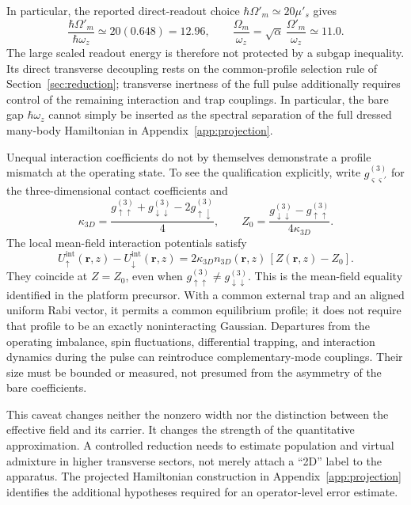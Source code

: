 \documentclass[11pt,a4paper]{article}
\theoremstyle{definition}
\theoremstyle{remark}
\newcommand{\musp}{\mu'_s}
\begin{document}
In particular, the reported direct-readout choice $\hbar\Omega'_m\simeq20\musp$ gives
\begin{equation}
 \frac{\hbar\Omega'_m}{\hbar\omega_z}
 \simeq20(0.648)=12.96,\qquad
 \frac{\Omega_m}{\omega_z}
 =\sqrt\alpha\,\frac{\Omega'_m}{\omega_z}\simeq11.0.
 \tag{21a}\label{eq:readout_gap}
\end{equation}
The large scaled readout energy is therefore not protected by a subgap inequality. Its direct transverse decoupling rests on the common-profile selection rule of Section~\ref{sec:reduction}; transverse inertness of the full pulse additionally requires control of the remaining interaction and trap couplings. In particular, the bare gap $\hbar\omega_z$ cannot simply be inserted as the spectral separation of the full dressed many-body Hamiltonian in Appendix~\ref{app:projection}.\cite{zhang2026}

Unequal interaction coefficients do not by themselves demonstrate a profile mismatch at the operating state. To see the qualification explicitly, write $g^{(3)}_{\varsigma\varsigma'}$ for the three-dimensional contact coefficients and
\[
 \kappa_{3D}=\frac{g^{(3)}_{\uparrow\uparrow}
 +g^{(3)}_{\downarrow\downarrow}-2g^{(3)}_{\uparrow\downarrow}}4,
 \qquad
 Z_0=\frac{g^{(3)}_{\downarrow\downarrow}-g^{(3)}_{\uparrow\uparrow}}
 {4\kappa_{3D}}.
\]
The local mean-field interaction potentials satisfy
\[
 U^{\mathrm{int}}_\uparrow(\boldsymbol r,z)
 -U^{\mathrm{int}}_\downarrow(\boldsymbol r,z)
 =2\kappa_{3D}n_{3D}(\boldsymbol r,z)\,[Z(\boldsymbol r,z)-Z_0].
\]
They coincide at $Z=Z_0$, even when $g^{(3)}_{\uparrow\uparrow}\ne g^{(3)}_{\downarrow\downarrow}$. This is the mean-field equality identified in the platform precursor. With a common external trap and an aligned uniform Rabi vector, it permits a common equilibrium profile; it does not require that profile to be an exactly noninteracting Gaussian. Departures from the operating imbalance, spin fluctuations, differential trapping, and interaction dynamics during the pulse can reintroduce complementary-mode couplings. Their size must be bounded or measured, not presumed from the asymmetry of the bare coefficients.\cite{precursor,zhang2026}

This caveat changes neither the nonzero width nor the distinction between the effective field and its carrier. It changes the strength of the quantitative approximation. A controlled reduction needs to estimate population and virtual admixture in higher transverse sectors, not merely attach a ``2D'' label to the apparatus. The projected Hamiltonian construction in Appendix~\ref{app:projection} identifies the additional hypotheses required for an operator-level error estimate.
\end{document}
